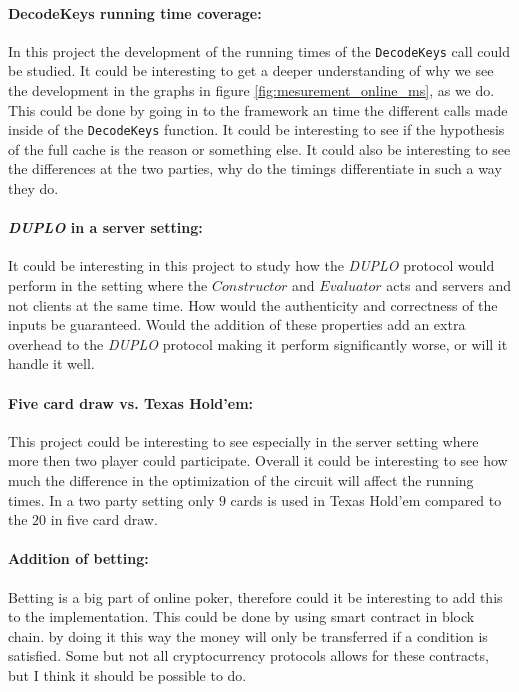 \documentclass[twoside,11pt,openright]{report}
\newcommand{\DUPLO}{\textit{DUPLO} }
\begin{document}
\paragraph{DecodeKeys running time coverage:}
In this project the development of the running times of the \verb|DecodeKeys| call could be studied. It could be interesting to get a deeper understanding of why we see the development in the graphs in figure \ref{fig:mesurement_online_ms}, as we do. This could be done by going in to the framework an time the different calls made inside of the \verb|DecodeKeys| function. It could be interesting to see if the hypothesis of the full cache is the reason or something else. It could also be interesting to see the differences at the two parties, why do the timings differentiate in such a way they do.

\paragraph{\DUPLO in a server setting:}
It could be interesting in this project to study how the \DUPLO protocol would perform in the setting where the $Constructor$ and $Evaluator$ acts and servers and not clients at the same time. How would the authenticity and correctness of the inputs be guaranteed. Would the addition of these properties add an extra overhead to the \DUPLO protocol making it perform significantly worse, or will it handle it well. 

\paragraph{Five card draw vs. Texas Hold'em:}
This project could be interesting to see especially in the server setting where more then two player could participate. Overall it could be interesting to see how much the difference in the optimization of the circuit will affect the running times. In a two party setting only $9$ cards is used in Texas Hold'em compared to the $20$ in five card draw.

\paragraph{Addition of betting:}
Betting is a big part of online poker, therefore could it be interesting to add this to the implementation. This could be done by using smart contract in block chain. by doing it this way the money will only be transferred if a condition is satisfied. Some but not all cryptocurrency protocols allows for these contracts, but I think it should be possible to do.
\end{document}
